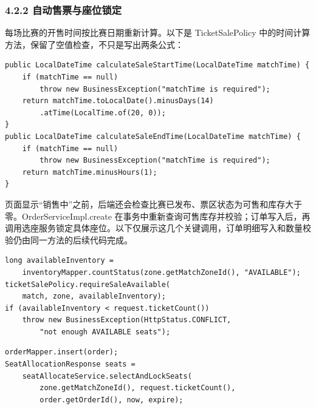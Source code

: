 \documentclass[UTF8,zihao=-4,a4paper]{ctexart}
\begin{document}
\subsubsection*{4.2.2 自动售票与座位锁定}

每场比赛的开售时间按比赛日期重新计算。以下是 TicketSalePolicy 中的时间计算方法，保留了空值检查，不只是写出两条公式：


\noindent\begin{minipage}{\linewidth}\small\begin{verbatim}
public LocalDateTime calculateSaleStartTime(LocalDateTime matchTime) {
    if (matchTime == null)
        throw new BusinessException("matchTime is required");
    return matchTime.toLocalDate().minusDays(14)
        .atTime(LocalTime.of(20, 0));
}
public LocalDateTime calculateSaleEndTime(LocalDateTime matchTime) {
    if (matchTime == null)
        throw new BusinessException("matchTime is required");
    return matchTime.minusHours(1);
}
\end{verbatim}\end{minipage}\par

页面显示“销售中”之前，后端还会检查比赛已发布、票区状态为可售和库存大于零。OrderServiceImpl.create 在事务中重新查询可售库存并校验；订单写入后，再调用选座服务锁定具体座位。以下仅展示这几个关键调用，订单明细写入和数量校验仍由同一方法的后续代码完成。


\noindent\begin{minipage}{\linewidth}\small\begin{verbatim}
long availableInventory =
    inventoryMapper.countStatus(zone.getMatchZoneId(), "AVAILABLE");
ticketSalePolicy.requireSaleAvailable(
    match, zone, availableInventory);
if (availableInventory < request.ticketCount())
    throw new BusinessException(HttpStatus.CONFLICT,
        "not enough AVAILABLE seats");
\end{verbatim}\end{minipage}\par

\noindent\begin{minipage}{\linewidth}\small\begin{verbatim}
orderMapper.insert(order);
SeatAllocationResponse seats =
    seatAllocateService.selectAndLockSeats(
        zone.getMatchZoneId(), request.ticketCount(),
        order.getOrderId(), now, expire);
\end{verbatim}\end{minipage}\par
\end{document}
